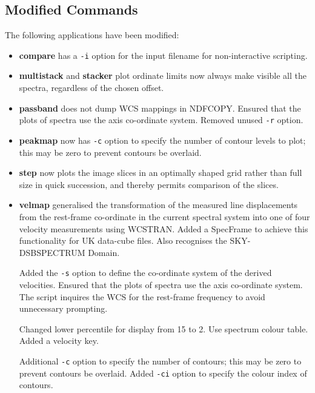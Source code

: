 \documentclass[twoside,11pt]{article}
\newcommand{\htmlref}[2]{#1}
\newcommand{\xref}[3]{#1}
\begin{document}
\subsection{Modified Commands}
The following applications have been modified:

\begin{itemize}

\item \htmlref{{\bf compare}}{compare} has a {\tt -i} option for the
input filename for non-interactive scripting.

\item \htmlref{{\bf multistack}}{multistack} and
\htmlref{{\bf stacker}}{stacker} plot ordinate limits now always
make visible all the spectra, regardless of the chosen offset.

\item \htmlref{{\bf passband}}{passband} does not dump WCS mappings 
in \xref{NDFCOPY}{sun95}{NDFCOPY}.  Ensured that the plots of spectra 
use the axis co-ordinate system.  Removed unused {\tt -r} option. 

\item \htmlref{{\bf peakmap}}{peakmap} now has {\tt -c} option to 
specify the number of contour levels to plot; this may be zero to
prevent contours be overlaid. 

\item \htmlref{{\bf step}}{step} now plots the image slices in an 
optimally shaped grid rather than full size in quick succession, and
thereby permits comparison of the slices. 

\item \htmlref{{\bf velmap}}{velmap} generalised the transformation of the
measured line displacements from the rest-frame co-ordinate in the
current spectral system into one of four velocity measurements using
WCSTRAN.  Added a SpecFrame to achieve this functionality for
UK data-cube files.  Also recognises the 
\xref{SKY-DSBSPECTRUM Domain}{sun95}{se_domains}.

Added the {\tt -s} option to define the co-ordinate system of the
derived velocities.  Ensured that the plots of spectra use the axis
co-ordinate system.  The script inquires the WCS for the rest-frame
frequency to avoid unnecessary prompting.

Changed lower percentile for display from 15 to 2.  Use spectrum
colour table.  Added a velocity key.

Additional {\tt -c} option to specify the number of contours; this may
be zero to prevent contours be overlaid.  Added {\tt -ci} option to
specify the colour index of contours.

\end{itemize}
\end{document}
